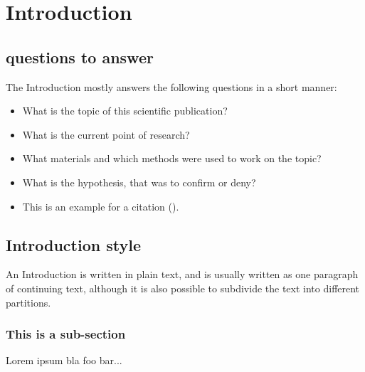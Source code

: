 \chapter{Introduction}

\section{questions to answer}
The Introduction mostly answers the following questions in a short manner:
\begin{itemize}
	\item What is the topic of this scientific publication?
	\item What is the current point of research?
	\item What materials and which methods were used to work on the topic?
	\item What is the hypothesis, that was to confirm or deny?
    \item This is an example for a citation (\cite{Beispiel1}). %

\end{itemize}

\section{Introduction style}
An Introduction is written in plain text, and is usually written as one
paragraph of continuing text, although it is also possible to subdivide the
text into different partitions.

\subsection{This is a sub-section}

Lorem ipsum bla foo bar...
